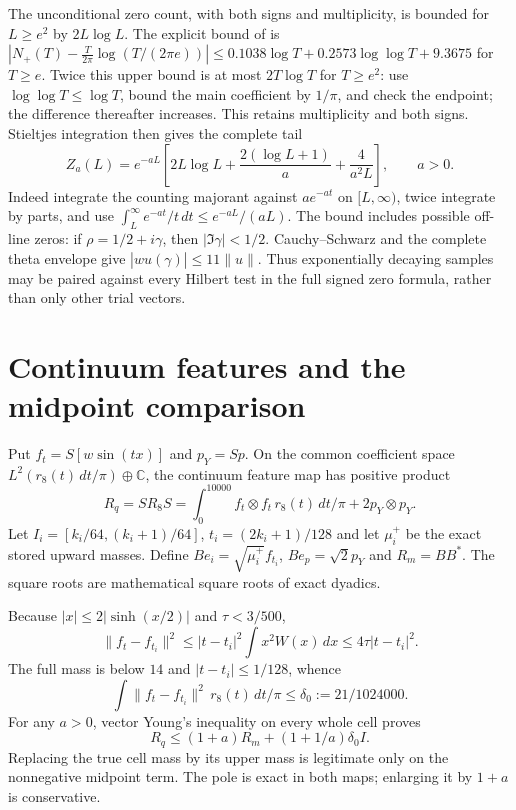 \documentclass[11pt]{article}
\newcommand{\dd}{\,d}
\numberwithin{equation}{section}
\begin{document}
The unconditional zero count, with both signs and multiplicity, is
bounded for $L\ge e^2$ by $2L\log L$. The explicit bound of \cite[Corollary 1.2]{HSW} is
$|N_+(T)-\frac{T}{2\pi}\log(T/(2\pi e))|
\le0.1038\log T+0.2573\log\log T+9.3675$ for $T\ge e$.
Twice this upper bound is at most $2T\log T$ for $T\ge e^2$:
use $\log\log T\le\log T$, bound the main coefficient by $1/\pi$,
and check the endpoint; the difference thereafter increases.
This retains multiplicity and both signs. Stieltjes integration then gives the complete tail
\begin{equation}\label{zerotail}
 Z_a(L)=e^{-aL}\left[2L\log L+
 \frac{2(\log L+1)}a+\frac4{a^2L}\right],\qquad a>0.
\end{equation}
Indeed integrate the counting majorant against $ae^{-at}$ on
$[L,\infty)$, twice integrate by parts, and use
$\int_L^\infty e^{-at}/t\dd t\le e^{-aL}/(aL)$.
The bound includes possible off-line zeros: if
$\rho=1/2+i\gamma$, then $|\Im\gamma|<1/2$. Cauchy--Schwarz and
the complete theta envelope give
$|\widehat{wu}(\gamma)|\le11\|u\|$. Thus exponentially decaying
samples may be paired against every Hilbert test in the full signed
zero formula, rather than only other trial vectors.

\section{Continuum features and the midpoint comparison}\label{midpoint}
Put $f_t=S[w\sin(tx)]$ and $p_Y=Sp$. On the common coefficient
space $L^2(r_8(t)\dd t/\pi)\oplus\mathbb C$, the continuum
feature map has positive product
\[
 R_q=SR_8S=\int_0^{10000} f_t\otimes f_t\,r_8(t)\dd t/\pi
             +2p_Y\otimes p_Y.
\]
Let $I_i=[k_i/64,(k_i+1)/64]$, $t_i=(2k_i+1)/128$ and let
$\mu_i^+$ be the exact stored upward masses. Define
$Be_i=\sqrt{\mu_i^+}f_{t_i}$, $Be_p=\sqrt2p_Y$ and $R_m=BB^*$.
The square roots are mathematical square roots of exact dyadics.

Because $|x|\le2|\sinh(x/2)|$ and $\tau<3/500$,
\[
 \|f_t-f_{t_i}\|^2\le |t-t_i|^2\int x^2W(x)\dd x
 \le4\tau|t-t_i|^2.
\]
The full mass is below $14$ and $|t-t_i|\le1/128$, whence
\begin{equation}\label{delta}
 \int\|f_t-f_{t_i}\|^2\,r_8(t)\dd t/\pi
       \le\delta_0:=21/1024000.
\end{equation}
For any $a>0$, vector Young's inequality on every whole cell proves
\begin{equation}\label{youngmid}
 R_q\le(1+a)R_m+(1+1/a)\delta_0I.
\end{equation}
Replacing the true cell mass by its upper mass is legitimate only
on the nonnegative midpoint term. The pole is exact in both maps;
enlarging it by $1+a$ is conservative.
\end{document}
